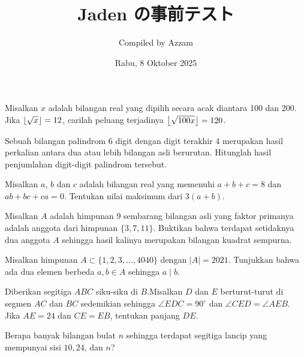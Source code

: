 \documentclass[11pt]{article}
\title{Jaden の事前テスト}
\begin{document}
\begin{CJK*}{UTF8}{min}
	
	\date{Rabu, 8 Oktober 2025}
	\author{Compiled by Azzam}
	\maketitle
	
	\begin{soalbaru}
	Misalkan $x$ adalah bilangan real yang dipilih secara acak diantara 100 dan 200. Jika $\left\lfloor \sqrt{x} \right\rfloor=12$, carilah peluang terjadinya $\left\lfloor \sqrt{100x} \right\rfloor=120$.
	\end{soalbaru}

    \begin{soalbaru}
        Sebuah bilangan palindrom 6 digit dengan digit terakhir 4 merupakan hasil perkalian antara dua atau lebih bilangan asli berurutan. Hitunglah hasil penjumlahan digit-digit palindrom tersebut.
    \end{soalbaru}

    \begin{soalbaru}
        Misalkan $a$, $b$ dan $c$ adalah bilangan real yang memenuhi $a + b + c = 8$ dan $ab + bc + ca = 0$.
Tentukan nilai maksimum dari $3(a + b)$.
    \end{soalbaru}

    \begin{soalbaru}
    Misalkan $A$ adalah himpunan 9 sembarang bilangan asli yang faktor primanya adalah anggota dari himpunan $\{3,7,11\}$. Buktikan bahwa terdapat setidaknya dua anggota $A$ sehingga hasil kalinya merupakan bilangan kuadrat sempurna.
\end{soalbaru}

\begin{soalbaru}
    Misalkan himpunan $A \subset \{1,2,3,\dots,4040\}$ dengan $|A| = 2021$. Tunjukkan bahwa ada dua elemen berbeda $a,b \in A$ sehingga $a \mid b$.
\end{soalbaru}
	
	\begin{soalbaru}
	Diberikan segitiga $ABC$ siku-siku di $B$.Misalkan $D$ dan $E$ berturut-turut di segmen $AC$ dan $BC$ sedemikian sehingga $\angle EDC= 90^\circ$ dan $\angle CED = \angle AEB$. Jika $AE = 24$ dan $CE=EB$, tentukan panjang $DE$.
	\end{soalbaru}
	
	\begin{soalbaru}
	Berapa banyak bilangan bulat $n$ sehingga terdapat segitiga lancip yang mempunyai sisi $10,24$, dan $n$?
	\end{soalbaru}


\end{CJK*}
\end{document}
